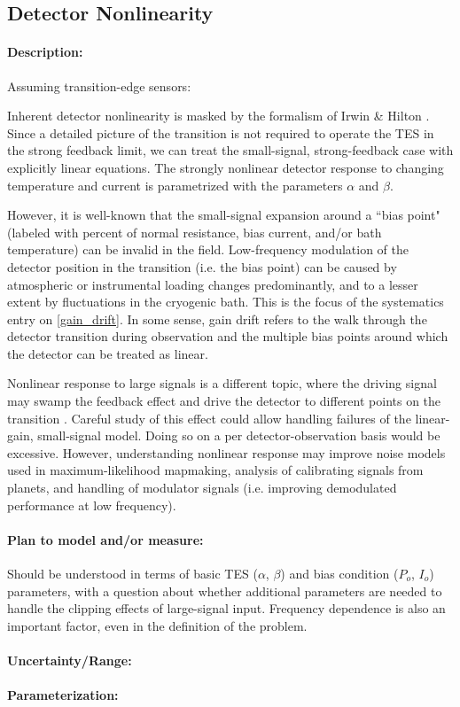 \subsection{Detector Nonlinearity}
\label{det_nonlinearity}

\paragraph{Description:}
Assuming transition-edge sensors:

Inherent detector nonlinearity is masked by the formalism of Irwin & Hilton \cite{IrwinHilton:2008}. Since a detailed picture of the transition is not required to operate the TES in the strong feedback limit, we can treat the small-signal, strong-feedback case with explicitly linear equations. The strongly nonlinear detector response to changing temperature and current is parametrized with the parameters $\alpha$ and $\beta$.

However, it is well-known that the small-signal expansion around a ``bias point" (labeled with percent of normal resistance, bias current, and/or bath temperature) can be invalid in the field. Low-frequency modulation of the detector position in the transition (i.e. the bias point) can be caused by atmospheric or instrumental loading changes predominantly, and to a lesser extent by fluctuations in the cryogenic bath. This is the focus of the systematics entry on \ref{gain_drift}. In some sense, gain drift refers to the walk through the detector transition during observation and the multiple bias points around which the detector can be treated as linear.

Nonlinear response to large signals is a different topic, where the driving signal may swamp the feedback effect and drive the detector to different points on the transition \cite{Rostem}. Careful study of this effect could allow handling failures of the linear-gain, small-signal model. Doing so on a per detector-observation basis would be excessive. However, understanding nonlinear response may improve noise models used in maximum-likelihood mapmaking, analysis of calibrating signals from planets, and handling of modulator signals (i.e. improving demodulated performance at low frequency).

\paragraph{Plan to model and/or measure:}

Should be understood in terms of basic TES ($\alpha$, $\beta$) and bias condition ($P_o$, $I_o$) parameters, with a question about whether additional parameters are needed to handle the clipping effects of large-signal input. Frequency dependence is also an important factor, even in the definition of the problem.

\paragraph{Uncertainty/Range:}

\paragraph{Parameterization:}